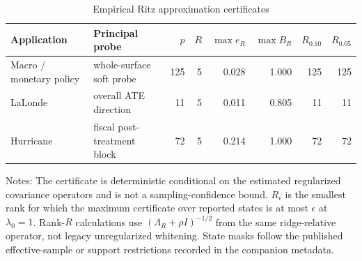 \begin{table}[!htbp]
\centering
\caption{Empirical Ritz approximation certificates}
\label{tab:ritz-certification-main}
\begin{tabular}{llrrrrrr}
\toprule
Application & Principal probe & $p$ & $R$ & $\max e_R$ & $\max B_R$ & $R_{0.10}$ & $R_{0.05}$ \\
\midrule
Macro / monetary policy & whole-surface soft probe & 125 & 5 & 0.028 & 1.000 & 125 & 125 \\
LaLonde & overall ATE direction & 11 & 5 & 0.011 & 0.805 & 11 & 11 \\
Hurricane & fiscal post-treatment block & 72 & 5 & 0.214 & 1.000 & 72 & 72 \\
\bottomrule
\end{tabular}
\begin{minipage}{0.96\linewidth}
\footnotesize Notes: The certificate is deterministic conditional on the estimated regularized covariance operators and is not a sampling-confidence bound. $R_\epsilon$ is the smallest rank for which the maximum certificate over reported states is at most $\epsilon$ at $\lambda_0=1$. Rank-$R$ calculations use $(\Lambda_R+\rho I)^{-1/2}$ from the same ridge-relative operator, not legacy unregularized whitening. State masks follow the published effective-sample or support restrictions recorded in the companion metadata.
\end{minipage}
\end{table}
